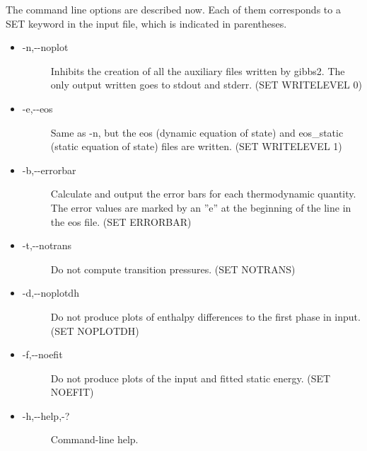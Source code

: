 \documentclass[a4paper]{article}
\begin{document}
The command line options are described now. Each of them corresponds
to a SET keyword in the input file, which is indicated in
parentheses.
%
\begin{itemize}

\item %
\begin{description}
\item[{-n,-{}-noplot}] \leavevmode 
Inhibits the creation of all the auxiliary files written by
gibbs2. The only output written goes to stdout and stderr.
(SET WRITELEVEL 0)

\end{description}

\item %
\begin{description}
\item[{-e,-{}-eos}] \leavevmode 
Same as -n, but the eos (dynamic equation of state) and
eos\_static (static equation of state) files are written.
(SET WRITELEVEL 1)

\end{description}

\item %
\begin{description}
\item[{-b,-{}-errorbar}] \leavevmode 
Calculate and output the error bars for each thermodynamic quantity.
The error values are marked by an ''e'' at the beginning of the line in
the eos file.
(SET ERRORBAR)

\end{description}

\item %
\begin{description}
\item[{-t,-{}-notrans}] \leavevmode 
Do not compute transition pressures.
(SET NOTRANS)

\end{description}

\item %
\begin{description}
\item[{-d,-{}-noplotdh}] \leavevmode 
Do not produce plots of enthalpy differences to the first phase in input.
(SET NOPLOTDH)

\end{description}

\item %
\begin{description}
\item[{-f,-{}-noefit}] \leavevmode 
Do not produce plots of the input and fitted static energy.
(SET NOEFIT)

\end{description}

\item %
\begin{description}
\item[{-h,-{}-help,-?}] \leavevmode 
Command-line help.

\end{description}

\end{itemize}
\end{document}
